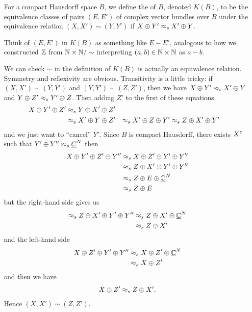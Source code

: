 \begin{definition}
For a compact Hausdorff space $B$, we define the 
of $B$, denoted $K(B)$, to be the equivalence classes of pairs
$(E,E')$ of complex vector bundles over $B$ under the equivalence
relation
$(X,X')\sim(Y,Y')$ if $X\oplus Y'\mathrel{\approx_{s}} X'\oplus Y$.
\end{definition}

\begin{remark}
Think of $(E,E')$ in $K(B)$ as something like $E-E'$, analogous to how
we constructed $\mathbb{Z}$ from $\mathbb{N}\times\mathbb{N}/\sim$ interpreting
$(a,b)\in\mathbb{N}\times\mathbb{N}$ as $a-b$.
\end{remark}

\begin{remark}
We can check $\sim$ in the definition of $K(B)$ is actually an
equivalence relation. Symmetry and reflexivity are
obvious. Transitivity is a little tricky: if $(X,X')\sim(Y,Y')$ and
$(Y,Y')\sim(Z,Z')$, then we have $X\oplus Y'\mathrel{\approx_{s}} X'\oplus Y$ and
$Y\oplus Z'\mathrel{\approx_{s}} Y'\oplus Z$. Then adding $Z'$ to the first of
these equations
\begin{subequations}
  \begin{align}
X\oplus Y'\oplus Z' &\mathrel{\approx_{s}} Y\oplus X'\oplus Z'\\
&\mathrel{\approx_{s}} X'\oplus Y\oplus Z'
&\mathrel{\approx_{s}} X'\oplus Z\oplus Y'
&\mathrel{\approx_{s}} Z\oplus X'\oplus Y'
  \end{align}
\end{subequations}
and we just want to ``cancel'' $Y'$. Since $B$ is compact Hausdorff,
there exists $X"$ such that $Y'\oplus Y''\mathrel{\approx_{s}}\underline{C}^{N}$ then
\begin{subequations}
  \begin{align}
X\oplus Y'\oplus Z'\oplus Y''
&\mathrel{\approx_{s}} X \oplus Z'\oplus Y'\oplus Y''\\
&\mathrel{\approx_{s}} Z\oplus X'\oplus Y'\oplus Y''\\
&\mathrel{\approx_{s}} Z\oplus E\oplus\underline{\mathbb{C}}^{N}\\
&\mathrel{\approx_{s}} Z\oplus E
  \end{align}
\end{subequations}
but the right-hand side gives us
\begin{subequations}
  \begin{align}
\mathrel{\approx_{s}} Z\oplus X'\oplus Y'\oplus Y''
&\mathrel{\approx_{s}} Z\oplus X'\oplus\underline{\mathbb{C}}^{N}\\
&\mathrel{\approx_{s}} Z\oplus X'
  \end{align}
\end{subequations}
and the left-hand side
\begin{subequations}
  \begin{align}
X \oplus Z'\oplus Y'\oplus Y''
&\mathrel{\approx_{s}} X\oplus Z'\oplus\underline{\mathbb{C}}^{N}\\
&\mathrel{\approx_{s}} X\oplus Z'
  \end{align}
\end{subequations}
and then we have
\begin{equation}
X\oplus Z'\mathrel{\approx_{s}} Z\oplus X'.
\end{equation}
Hence $(X,X')\sim(Z,Z')$.
\end{remark}

